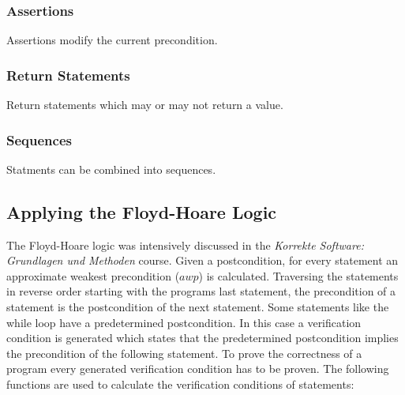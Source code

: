 \documentclass[12pt]{article}
\begin{document}
\subsubsection*{Assertions}
Assertions modify the current precondition.

\subsubsection*{Return Statements}
Return statements which may or may not return a value.

\subsubsection*{Sequences}
Statments can be combined into sequences.

\subsection{Applying the Floyd-Hoare Logic}

The Floyd-Hoare logic was intensively discussed in the \emph{Korrekte Software: Grundlagen und Methoden} course. 
Given a postcondition, for every statement an approximate weakest precondition ($awp$) is calculated.
Traversing the statements in reverse order starting with the programs last statement, the precondition of a statement is the postcondition of the next statement.
Some statements like the while loop have a predetermined postcondition.
In this case a verification condition is generated which states that the predetermined postcondition implies the precondition of the following statement.
To prove the correctness of a program every generated verification condition has to be proven.
The following functions are used to calculate the verification conditions of statements:
\end{document}
